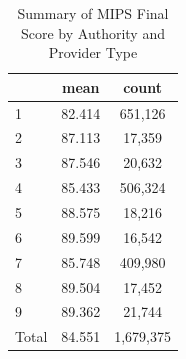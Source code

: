 \begin{table}[htbp]\centering
\def\sym#1{\ifmmode^{#1}\else\(^{#1}\)\fi}
\caption{Summary of MIPS Final Score by Authority and Provider Type}
\begin{tabular}{l*{1}{cc}}
\toprule
                    &        mean&       count\\
\midrule
1                   &      82.414&     651,126\\
2                   &      87.113&      17,359\\
3                   &      87.546&      20,632\\
4                   &      85.433&     506,324\\
5                   &      88.575&      18,216\\
6                   &      89.599&      16,542\\
7                   &      85.748&     409,980\\
8                   &      89.504&      17,452\\
9                   &      89.362&      21,744\\
Total               &      84.551&   1,679,375\\
\bottomrule
\end{tabular}
\end{table}

